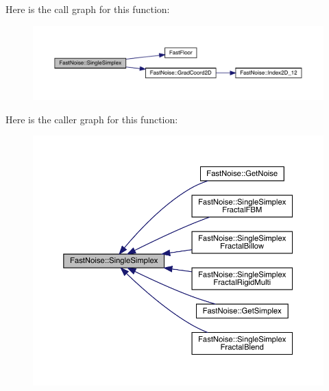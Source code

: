 Here is the call graph for this function\+:
\nopagebreak
\begin{figure}[H]
\begin{center}
\leavevmode
\includegraphics[width=350pt]{class_fast_noise_a1aa539b6129719546bb4ed2847f1a11f_cgraph}
\end{center}
\end{figure}
Here is the caller graph for this function\+:
\nopagebreak
\begin{figure}[H]
\begin{center}
\leavevmode
\includegraphics[width=350pt]{class_fast_noise_a1aa539b6129719546bb4ed2847f1a11f_icgraph}
\end{center}
\end{figure}
\mbox{\label{class_fast_noise_a5e40c643992d4099dbe7f0a5be6460e7}} 
